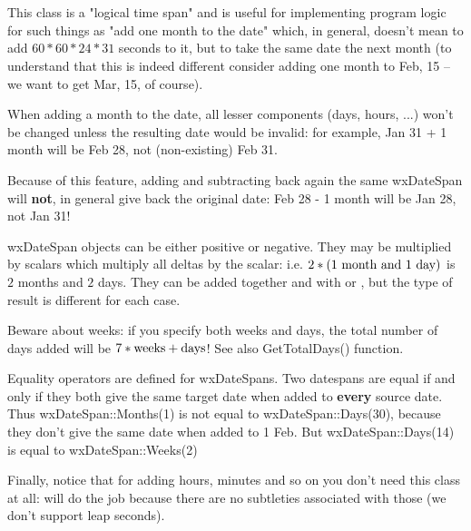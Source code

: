 
\section{}\label{wxdatespan}

This class is a "logical time span" and is useful for implementing program
logic for such things as "add one month to the date" which, in general,
doesn't mean to add $60*60*24*31$ seconds to it, but to take the same date
the next month (to understand that this is indeed different consider adding
one month to Feb, 15 -- we want to get Mar, 15, of course).

When adding a month to the date, all lesser components (days, hours, ...)
won't be changed unless the resulting date would be invalid: for example,
Jan 31 + 1 month will be Feb 28, not (non-existing) Feb 31.

Because of this feature, adding and subtracting back again the same
wxDateSpan will {\bf not}, in general give back the original date: Feb 28 - 1
month will be Jan 28, not Jan 31!

wxDateSpan objects can be either positive or negative. They may be
multiplied by scalars which multiply all deltas by the scalar: i.e.
$2*(1 \hbox{ month and } 1 \hbox{ day})$ is $2$ months and $2$ days. They can
be added together and with  or 
, but the type of result is different for each
case.

Beware about weeks: if you specify both weeks and days, the total number of
days added will be $7*\hbox{weeks} + \hbox{days}$! See also GetTotalDays()
function.

Equality operators are defined for wxDateSpans. Two datespans are equal if
and only if they both give the same target date when added to {\bf every}\rtfsp
source date. Thus wxDateSpan::Months(1) is not equal to wxDateSpan::Days(30),
because they don't give the same date when added to 1 Feb. But
wxDateSpan::Days(14) is equal to wxDateSpan::Weeks(2)

Finally, notice that for adding hours, minutes and so on you don't need this
class at all:  will do the job because there
are no subtleties associated with those (we don't support leap seconds).

